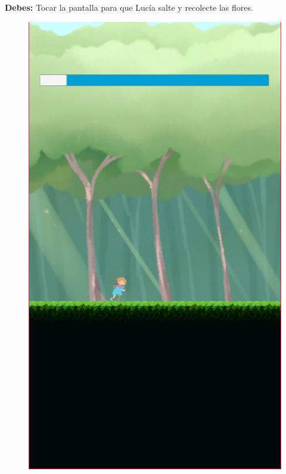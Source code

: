 \textbf{Debes:} Tocar la pantalla para que Lucía salte y recolecte las flores.

\begin{figure}[h]
	\centering
	\begin{minipage}{0.45\textwidth}
   		\includegraphics[scale=.5]{imgs/screenshot09.png}
	\end{minipage}
	\begin{minipage}{0.45\textwidth}
		\begin{flushright}

\end{flushright}
\end{minipage}
\end{figure}
